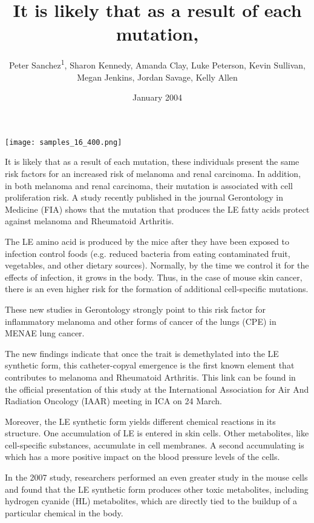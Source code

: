 \documentclass{article}
\title{It is likely that as a result of each mutation,}
\author{Peter Sanchez\textsuperscript{1},  Sharon Kennedy,  Amanda Clay,  Luke Peterson,  Kevin Sullivan,  Megan Jenkins,  Jordan Savage,  Kelly Allen}
\affil{\textsuperscript{1}Rutgers, The State University of New Jersey}
\date{January 2004}
\begin{document}
\maketitle

\begin{center}
\begin{minipage}{0.75\linewidth}
\texttt{[image: samples\_16\_400.png]}
\end{minipage}
\end{center}

It is likely that as a result of each mutation, these individuals present the same risk factors for an increased risk of melanoma and renal carcinoma. In addition, in both melanoma and renal carcinoma, their mutation is associated with cell proliferation risk. A study recently published in the journal Gerontology in Medicine (FIA) shows that the mutation that produces the LE fatty acids protect against melanoma and Rheumatoid Arthritis.

The LE amino acid is produced by the mice after they have been exposed to infection control foods (e.g. reduced bacteria from eating contaminated fruit, vegetables, and other dietary sources). Normally, by the time we control it for the effects of infection, it grows in the body. Thus, in the case of mouse skin cancer, there is an even higher risk for the formation of additional cell-specific mutations.

These new studies in Gerontology strongly point to this risk factor for inflammatory melanoma and other forms of cancer of the lungs (CPE) in MENAE lung cancer.

The new findings indicate that once the trait is demethylated into the LE synthetic form, this catheter-copyal emergence is the first known element that contributes to melanoma and Rheumatoid Arthritis. This link can be found in the official presentation of this study at the International Association for Air And Radiation Oncology (IAAR) meeting in ICA on 24 March.

Moreover, the LE synthetic form yields different chemical reactions in its structure. One accumulation of LE is entered in skin cells. Other metabolites, like cell-specific substances, accumulate in cell membranes. A second accumulating is which has a more positive impact on the blood pressure levels of the cells.

In the 2007 study, researchers performed an even greater study in the mouse cells and found that the LE synthetic form produces other toxic metabolites, including hydrogen cyanide (HL) metabolites, which are directly tied to the buildup of a particular chemical in the body.
\end{document}
